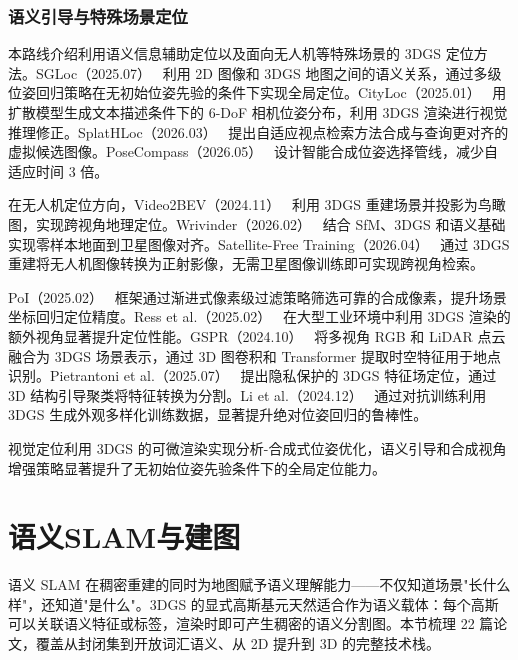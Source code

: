 \subsubsection{语义引导与特殊场景定位}

本路线介绍利用语义信息辅助定位以及面向无人机等特殊场景的 3DGS 定位方法。SGLoc（2025.07）~\cite{2507_12027} 利用 2D 图像和 3DGS 地图之间的语义关系，通过多级位姿回归策略在无初始位姿先验的条件下实现全局定位。CityLoc（2025.01）~\cite{2501_08982} 用扩散模型生成文本描述条件下的 6-DoF 相机位姿分布，利用 3DGS 渲染进行视觉推理修正。SplatHLoc（2026.03）~\cite{2603_29185} 提出自适应视点检索方法合成与查询更对齐的虚拟候选图像。PoseCompass（2026.05）~\cite{2605_12144} 设计智能合成位姿选择管线，减少自适应时间 3 倍。

在无人机定位方向，Video2BEV（2024.11）~\cite{2411_13610} 利用 3DGS 重建场景并投影为鸟瞰图，实现跨视角地理定位。Wrivinder（2026.02）~\cite{2602_14929} 结合 SfM、3DGS 和语义基础实现零样本地面到卫星图像对齐。Satellite-Free Training（2026.04）~\cite{2604_01581} 通过 3DGS 重建将无人机图像转换为正射影像，无需卫星图像训练即可实现跨视角检索。

PoI（2025.02）~\cite{2502_04843} 框架通过渐进式像素级过滤策略筛选可靠的合成像素，提升场景坐标回归定位精度。Ress et al.（2025.02）~\cite{2502_13803} 在大型工业环境中利用 3DGS 渲染的额外视角显著提升定位性能。GSPR（2024.10）~\cite{2410_00299} 将多视角 RGB 和 LiDAR 点云融合为 3DGS 场景表示，通过 3D 图卷积和 Transformer 提取时空特征用于地点识别。Pietrantoni et al.（2025.07）~\cite{2507_23569} 提出隐私保护的 3DGS 特征场定位，通过 3D 结构引导聚类将特征转换为分割。Li et al.（2024.12）~\cite{2412_00138} 通过对抗训练利用 3DGS 生成外观多样化训练数据，显著提升绝对位姿回归的鲁棒性。

\begin{takeaway}
视觉定位利用 3DGS 的可微渲染实现分析-合成式位姿优化，语义引导和合成视角增强策略显著提升了无初始位姿先验条件下的全局定位能力。
\end{takeaway}



\section{语义SLAM与建图}
\label{sec:15_5}

语义 SLAM 在稠密重建的同时为地图赋予语义理解能力——不仅知道场景"长什么样"，还知道"是什么"。3DGS 的显式高斯基元天然适合作为语义载体：每个高斯可以关联语义特征或标签，渲染时即可产生稠密的语义分割图。本节梳理 22 篇论文，覆盖从封闭集到开放词汇语义、从 2D 提升到 3D 的完整技术栈。

